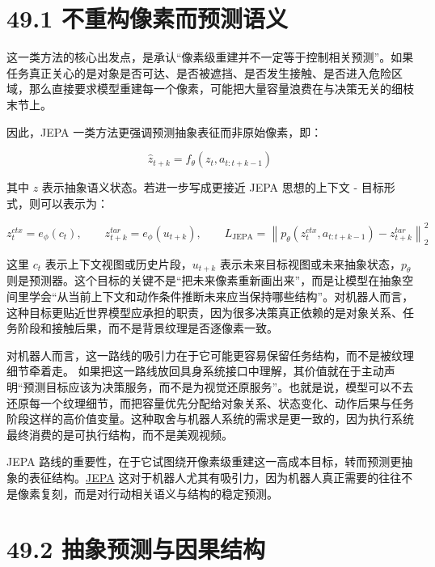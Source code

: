\section*{49.1 不重构像素而预测语义}


这一类方法的核心出发点，是承认“像素级重建并不一定等于控制相关预测”。如果任务真正关心的是对象是否可达、是否被遮挡、是否发生接触、是否进入危险区域，那么直接要求模型重建每一个像素，可能把大量容量浪费在与决策无关的细枝末节上。

因此，JEPA 一类方法更强调预测抽象表征而非原始像素，即：

\begin{equation*}
\hat{z}_{t+k} = f_\theta(z_t, a_{t:t+k-1})
\end{equation*}

其中 \(z\) 表示抽象语义状态。若进一步写成更接近 JEPA 思想的上下文 - 目标形式，则可以表示为：

\begingroup
\scriptsize
\begin{equation*}
z_t^{ctx} = e_\phi(c_t), \qquad
z_{t+k}^{tar} = e_\phi(u_{t+k}), \qquad
L_{\mathrm{JEPA}} = \left\| p_\theta(z_t^{ctx}, a_{t:t+k-1}) - z_{t+k}^{tar} \right\|_2^2
\end{equation*}
\endgroup

这里 \(c_t\) 表示上下文视图或历史片段，\(u_{t+k}\) 表示未来目标视图或未来抽象状态，\(p_\theta\) 则是预测器。这个目标的关键不是“把未来像素重新画出来”，而是让模型在抽象空间里学会“从当前上下文和动作条件推断未来应当保持哪些结构”。对机器人而言，这种目标更贴近世界模型应承担的职责，因为很多决策真正依赖的是对象关系、任务阶段和接触后果，而不是背景纹理是否逐像素一致。

对机器人而言，这一路线的吸引力在于它可能更容易保留任务结构，而不是被纹理细节牵着走。 如果把这一路线放回具身系统接口中理解，其价值就在于主动声明“预测目标应该为决策服务，而不是为视觉还原服务”。也就是说，模型可以不去还原每一个纹理细节，而把容量优先分配给对象关系、状态变化、动作后果与任务阶段这样的高价值变量。这种取舍与机器人系统的需求是更一致的，因为执行系统最终消费的是可执行结构，而不是美观视频。

JEPA 路线的重要性，在于它试图绕开像素级重建这一高成本目标，转而预测更抽象的表征结构。\href{https://arxiv.org/abs/2301.08243}{JEPA} 这对于机器人尤其有吸引力，因为机器人真正需要的往往不是像素复刻，而是对行动相关语义与结构的稳定预测。

\section*{49.2 抽象预测与因果结构}


